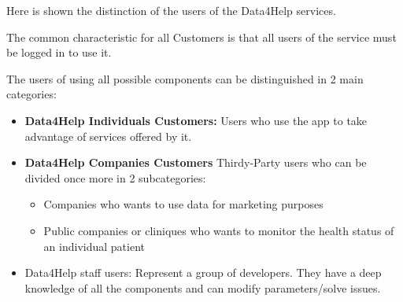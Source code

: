 Here is shown the distinction of the users of the Data4Help services.

\noindent The common characteristic for all Customers is that all users of the service must be logged in to use it.

\noindent The users of using all possible components can be distinguished in 2 main categories:

\begin{itemize}
    \item \textbf{Data4Help Individuals Customers:}
Users who use the app to take advantage of services offered by it.
    \item \textbf{Data4Help Companies Customers}
Thirdy-Party users who can be divided once more in 2 subcategories:
    \begin{itemize}
        \item Companies who wants to use data for marketing purposes
        \item Public companies or cliniques who wants to monitor the health status of an individual patient
    \end{itemize}
    \item Data4Help staff users:
Represent a group of developers. They have a deep knowledge of all the components and can modify parameters/solve issues.

\end{itemize}





